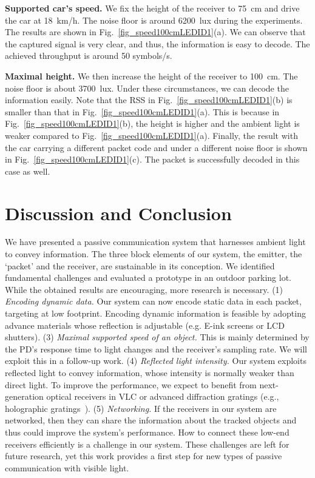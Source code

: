 \documentclass[10pt]{sig-alternate-05-2015}
\begin{document}
\textbf{Supported car's speed.} We fix the height of the receiver to 75~cm and drive the car at 18~km/h. The noise floor is around 6200~lux during the experiments. The results are shown in Fig.~\ref{fig_speed100cmLEDID1}(a). We can observe that the captured signal is very clear, and thus, the information is easy to decode. The achieved throughput is around 50 symbols/s.

\textbf{Maximal height.} We then increase the height of the receiver to 100~cm. The noise floor is about 3700~lux. Under these circumstances, we can decode the information easily.  Note that the RSS in Fig.~\ref{fig_speed100cmLEDID1}(b)  is smaller than that in Fig.~\ref{fig_speed100cmLEDID1}(a). This is because in Fig.~\ref{fig_speed100cmLEDID1}(b), the height is higher and the ambient light is weaker compared to Fig.~\ref{fig_speed100cmLEDID1}(a). Finally, the result with the car carrying a different packet code and under a different noise floor is shown in Fig.~\ref{fig_speed100cmLEDID1}(c). The packet is successfully decoded in this case as well.


\section{Discussion and Conclusion} \label{sec_discu}

We have presented a passive communication system that harnesses ambient light to convey information. 
The three block elements of our system, the emitter, the `packet' and the receiver, are sustainable in its conception. We identified fundamental challenges and evaluated a prototype in an outdoor parking lot. While the obtained results are encouraging, more research is necessary. 
(1) \emph{Encoding dynamic data.} Our system can now encode static data in each packet, targeting at low footprint. Encoding dynamic information is feasible by adopting advance materials whose reflection is adjustable (e.g. E-ink screens or LCD shutters).
(3) \emph{Maximal supported speed of an object.} This is mainly determined by the PD's response time to light changes and the receiver's sampling rate. We will exploit this in a follow-up work.
(4) \emph{Reflected light intensity.} Our system exploits reflected light to convey information, whose intensity is normally weaker than direct light. To improve the performance, we expect to benefit from next-generation optical receivers in VLC or advanced diffraction gratings (e.g., holographic gratings~\cite{Yetisen2013}). (5) \emph{Networking.} If the receivers in our system are networked, then they can share the information about the tracked objects and thus could improve the system's performance. How to connect these low-end receivers efficiently is a challenge in our system. These challenges are left for future research, yet this work provides a first step for new types of  passive communication with visible light.
\end{document}
